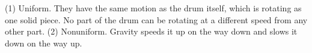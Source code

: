 (1) Uniform. They have the same motion as the drum
 itself, which is rotating as one solid piece. No part of the
drum can be rotating at a different speed from
 any other part. (2) Nonuniform. Gravity speeds it up on the way
down and slows it down on the way up.



